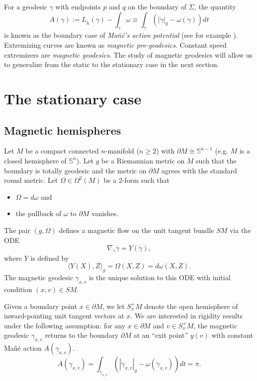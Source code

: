\documentclass[12pt]{amsart}
\numberwithin{equation}{section}
\begin{document}
For a geodesic $\gamma$ with endpoints $p$ and $q$ on the boundary of $\Sigma$, the quantity
\begin{equation}
\label{eq3.7}
A(\gamma):=L_{\tilde h}(\gamma)-\int_{\gamma} \omega \equiv \int_{\gamma} \left( |\dot{\gamma}|_g - \omega(\dot{\gamma}) \right) dt
\end{equation}
is known as the boundary case of \emph{Ma\~n\'e's action potential} (see for example \cite{DPSU}). Extremizing curves are known as \emph{magnetic pre-geodesics}. Constant speed extremizers are \emph{magnetic geodesics}. The study of magnetic geodesics will allow us to generalize from the static to the stationary case in the next section.

\section{The stationary case} \label{section4}
\setcounter{equation}{0}

\subsection{Magnetic hemispheres}\label{section4.1}Let $M$ be a compact connected $n$-manifold ($n\geq 2$) with $\partial M \cong {\mathbb S}^{n-1}$ (e.g. $M$ is a closed hemisphere of ${\mathbb S}^{n}$).
Let $g$ be a Riemannian metric on $M$ such that the boundary is totally geodesic and the metric on $\partial M$ agrees with the standard round metric. Let $\Omega \in \Omega^2(M)$ be a 2-form such that
\begin{itemize}
\item [i)] $\Omega=d\omega$ and
\item [ii)] the pullback of $\omega$ to $\partial M$ vanishes.
\end{itemize}
The pair $(g,\Omega)$ defines a magnetic flow on the unit tangent bundle $SM$ via the ODE
\begin{equation}
\label{eq4.1}
\nabla_{\dot{\gamma}} \dot{\gamma} = Y(\dot{\gamma}),
\end{equation}
where $Y$ is defined by
\begin{equation}
\label{eq4.2}
\langle Y(X), Z \rangle_g = \Omega(X, Z)=d\omega(X,Z).
\end{equation}
The magnetic geodesic $\gamma_{x,v}$ is the unique solution to this ODE with initial condition $(x,v)\in SM$.

Given a boundary point $x\in \partial M$,  we let $S_x^+ M$ denote the open hemisphere of inward-pointing unit tangent vectors at $x$. We are interested in rigidity results under the following assumption: for any $x\in \partial M$ and $v\in S_x^+ M$, the magnetic geodesic $\gamma_{x,v}$ returns to the boundary $\partial M$ at an ``exit point'' $y(v)$ with constant Ma\~n\'e action $A(\gamma_{x,v})$.
\begin{equation}\label{eq:A=pi}
    A(\gamma_{x,v}) =\int_{\gamma_{x,v}} \left( |\dot{\gamma}_{x,v}|_g - \omega(\dot{\gamma}_{x,v}) \right) dt = \pi.
\end{equation}
\end{document}
